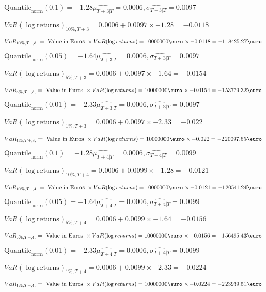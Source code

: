 $\text{Quantile}_\text{norm}(0.1) = -1.28$$\hat{\mu_{T+3|T}} = 0.0006, \hat{\sigma_{T+3|T}} = 0.0097$

$VaR(\log \text{returns})_{10\%, T + 3} = 0.0006 + 0.0097\times-1.28 = -0.0118$

$VaR_{10\%, T + ,3,} = \text{ Value in Euros } \times VaR(\log returns) = 10 000 000 \text{\euro} \times-0.0118 = -118425.27 \text{\euro}$


$\text{Quantile}_\text{norm}(0.05) = -1.64$$\hat{\mu_{T+3|T}} = 0.0006, \hat{\sigma_{T+3|T}} = 0.0097$

$VaR(\log \text{returns})_{5\%, T + 3} = 0.0006 + 0.0097\times-1.64 = -0.0154$

$VaR_{5\%, T + ,3,} = \text{ Value in Euros } \times VaR(\log returns) = 10 000 000 \text{\euro} \times-0.0154 = -153779.32 \text{\euro}$


$\text{Quantile}_\text{norm}(0.01) = -2.33$$\hat{\mu_{T+3|T}} = 0.0006, \hat{\sigma_{T+3|T}} = 0.0097$

$VaR(\log \text{returns})_{1\%, T + 3} = 0.0006 + 0.0097\times-2.33 = -0.022$

$VaR_{1\%, T + ,3,} = \text{ Value in Euros } \times VaR(\log returns) = 10 000 000 \text{\euro} \times-0.022 = -220097.65 \text{\euro}$


$\text{Quantile}_\text{norm}(0.1) = -1.28$$\hat{\mu_{T+4|T}} = 0.0006, \hat{\sigma_{T+4|T}} = 0.0099$

$VaR(\log \text{returns})_{10\%, T + 4} = 0.0006 + 0.0099\times-1.28 = -0.0121$

$VaR_{10\%, T + ,4,} = \text{ Value in Euros } \times VaR(\log returns) = 10 000 000 \text{\euro} \times-0.0121 = -120541.24 \text{\euro}$


$\text{Quantile}_\text{norm}(0.05) = -1.64$$\hat{\mu_{T+4|T}} = 0.0006, \hat{\sigma_{T+4|T}} = 0.0099$

$VaR(\log \text{returns})_{5\%, T + 4} = 0.0006 + 0.0099\times-1.64 = -0.0156$

$VaR_{5\%, T + ,4,} = \text{ Value in Euros } \times VaR(\log returns) = 10 000 000 \text{\euro} \times-0.0156 = -156495.43 \text{\euro}$


$\text{Quantile}_\text{norm}(0.01) = -2.33$$\hat{\mu_{T+4|T}} = 0.0006, \hat{\sigma_{T+4|T}} = 0.0099$

$VaR(\log \text{returns})_{1\%, T + 4} = 0.0006 + 0.0099\times-2.33 = -0.0224$

$VaR_{1\%, T + ,4,} = \text{ Value in Euros } \times VaR(\log returns) = 10 000 000 \text{\euro} \times-0.0224 = -223939.51 \text{\euro}$


